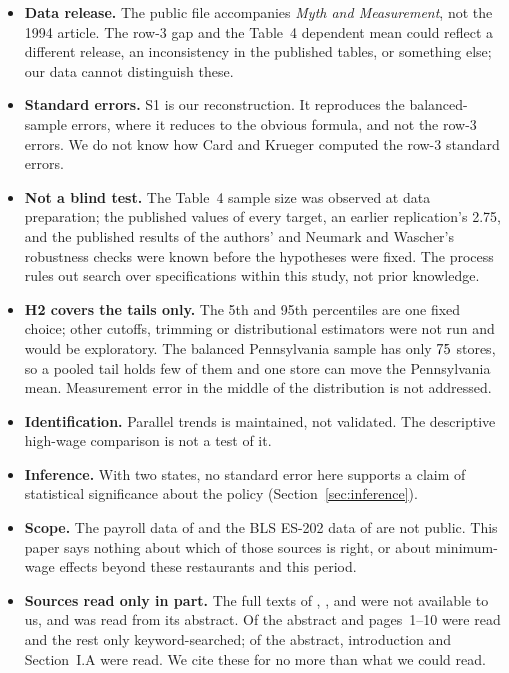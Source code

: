 \documentclass[11pt]{article}
\begin{document}
\begin{itemize}
  \item \textbf{Data release.} The public file accompanies \emph{Myth and Measurement}, not
        the 1994 article. The row-3 gap and the Table~4 dependent mean could reflect a
        different release, an inconsistency in the published tables, or something else; our
        data cannot distinguish these.
  \item \textbf{Standard errors.} S1 is our reconstruction. It reproduces the balanced-sample
        errors, where it reduces to the obvious formula, and not the row-3 errors. We do not
        know how Card and Krueger computed the row-3 standard errors.
  \item \textbf{Not a blind test.} The Table~4 sample size was observed at data preparation;
        the published values of every target, an earlier replication's 2.75, and the
        published results of the authors' and Neumark and Wascher's robustness checks were
        known before the hypotheses were fixed. The process rules out search over
        specifications within this study, not prior knowledge.
  \item \textbf{H2 covers the tails only.} The 5th and 95th percentiles are one fixed choice;
        other cutoffs, trimming or distributional estimators were not run and would be
        exploratory. The balanced Pennsylvania sample has only $75$ stores, so a pooled
        tail holds few of them and one store can move the Pennsylvania mean. Measurement
        error in the middle of the distribution is not addressed.
  \item \textbf{Identification.} Parallel trends is maintained, not validated. The descriptive
        high-wage comparison is not a test of it.
  \item \textbf{Inference.} With two states, no standard error here supports a claim of
        statistical significance about the policy (Section~\ref{sec:inference}).
  \item \textbf{Scope.} The payroll data of \citet{neumark1995payroll} and the BLS ES-202 data
        of \citet{card1998reanalysis} are not public. This paper says nothing about which of
        those sources is right, or about minimum-wage effects beyond these restaurants and
        this period.
  \item \textbf{Sources read only in part.} The full texts of \citet{neumark2000comment},
        \citet{card2000reply}, \citet{ropponen2011reconciling} and \citet{ropponen2014note}
        were not available to us, and \citet{conley2011inference} was read from its
        abstract. Of \citet{neumark1995payroll} the abstract and pages~1--10 were read
        and the rest only keyword-searched; of \citet{card1998reanalysis} the abstract,
        introduction and Section~I.A were read. We cite these for no more than what we
        could read.
\end{itemize}
\end{document}
